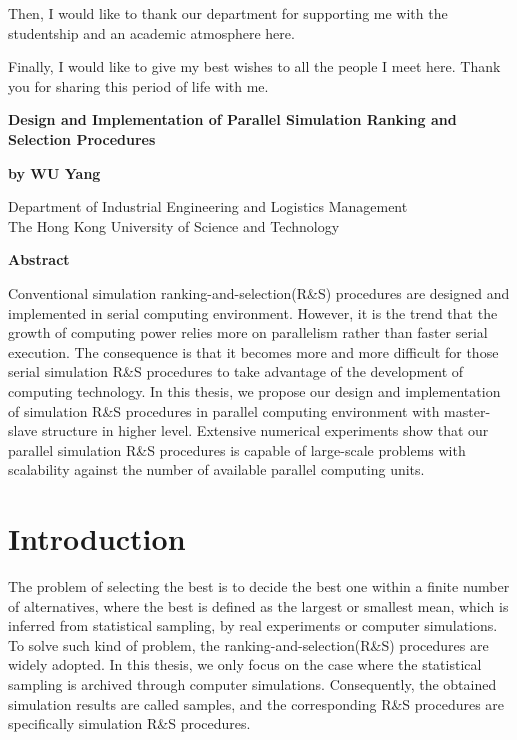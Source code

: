 \documentclass[12pt,a4paper]{report}
\begin{document}
Then, I would like to thank our department for supporting me with the studentship and an academic atmosphere here.

Finally, I would like to give my best wishes to all the people I meet here. Thank you for sharing this period of life with me.

\newpage
{}
\tableofcontents
\listoffigures
\listoftables

\newpage
{}
\begin{center}
{\Large\bf Design and Implementation of Parallel Simulation Ranking and Selection Procedures}
\vspace{0.5cm}

{\large \bf by WU Yang}\normalsize

\medskip

Department of Industrial Engineering and Logistics Management \\
The Hong Kong University of Science and Technology

\end{center}
\vspace{1.5cm}
\centerline{{\bf \large Abstract}}
\vspace{1.5cm}

Conventional simulation ranking-and-selection(R\&S) procedures are designed and implemented in serial computing environment. However, it is the trend that the growth of computing power relies more on parallelism rather than faster serial execution. The consequence is that it becomes more and more difficult for those serial simulation R\&S procedures to take advantage of the development of computing technology. In this thesis, we propose our design and implementation of simulation R\&S procedures in parallel computing environment with master-slave structure in higher level. Extensive numerical experiments show that our parallel simulation R\&S procedures is capable of large-scale problems with scalability against the number of available parallel computing units.

\newpage
{}

\chapter{Introduction}

The problem of selecting the best is to decide the best one within a finite number of alternatives, where the best is defined as the largest or smallest mean, which is inferred from statistical sampling, by real experiments or computer simulations. To solve such kind of problem, the ranking-and-selection(R\&S) procedures are widely adopted. In this thesis, we only focus on the case where the statistical sampling is archived through computer simulations. Consequently, the obtained simulation results are called samples, and the corresponding R\&S procedures are specifically simulation R\&S procedures.
\end{document}
